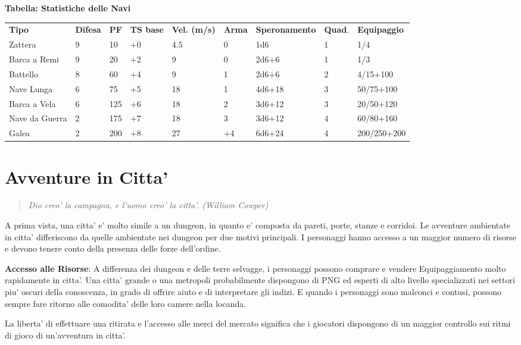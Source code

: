 \documentclass[a4paper,11pt,twoside,openany]{book}
\begin{document}
{\bigskip

\textbf{Tabella: Statistiche delle Navi}

\medskip

\begin{tabular}{L{2cm} L{1cm} L{1cm} L{1cm} L{1.5cm} L{1cm} L{2cm} L{1cm} L{2cm}}
\toprule
\textbf{Tipo} & \textbf{Difesa} & \textbf{PF} & \textbf{TS base} & \textbf{Vel. (m/s)} & \textbf{Arma} & \textbf{Speronamento} & \textbf{Quad}. & \textbf{Equipaggio}\tabularnewline
Zattera & 9 & 10 & +0 & 4.5 & 0 & 1d6 & 1 & 1/4\tabularnewline
Barca a Remi & 9 & 20 & +2 & 9 & 0 & 2d6+6 & 1 & 1/3\tabularnewline
Battello & 8 & 60 & +4 & 9 & 1 & 2d6+6 & 2 & 4/15+100\tabularnewline
Nave Lunga & 6 & 75 & +5 & 18 & 1 & 4d6+18 & 3 & 50/75+100\tabularnewline
Barca a Vela & 6 & 125 & +6 & 18 & 2 & 3d6+12 & 3 & 20/50+120\tabularnewline
Nave da Guerra & 2 & 175 & +7 & 18 & 3 & 3d6+12 & 4 & 60/80+160\tabularnewline
Galea & 2 & 200 & +8 & 27 & +4 & 6d6+24 & 4 & 200/250+200\tabularnewline
\end{tabular}

\pagebreak

\section{Avventure in Citta'}

\label{avventure-in-citta}
\begin{quote}\textit{
Dio creo' la campagna, e l'uomo creo' la citta'. (William Cowper)
}\end{quote}

A prima vista, una citta' e' molto simile a un dungeon, in quanto e' composta da pareti, porte, stanze e corridoi. Le avventure ambientate in citta' differiscono da quelle ambientate nei dungeon per due motivi principali. I personaggi hanno accesso a un maggior numero di risorse e devono tenere conto della presenza delle forze dell'ordine.

\textbf{Accesso alle Risorse}: A differenza dei dungeon e delle terre selvagge, i personaggi possono comprare e vendere Equipaggiamento molto rapidamente in citta'. Una citta' grande o una metropoli probabilmente dispongono di PNG ed esperti di alto livello specializzati nei settori piu' oscuri della conoscenza, in grado di offrire aiuto e di interpretare gli indizi. E quando i personaggi sono malconci e contusi, possono sempre fare ritorno alle comodita' delle loro camere nella locanda.

La liberta' di effettuare una ritirata e l'accesso alle merci del mercato significa che i giocatori dispongono di un maggior controllo sui ritmi di gioco di un'avventura in citta'.

}
\end{document}
